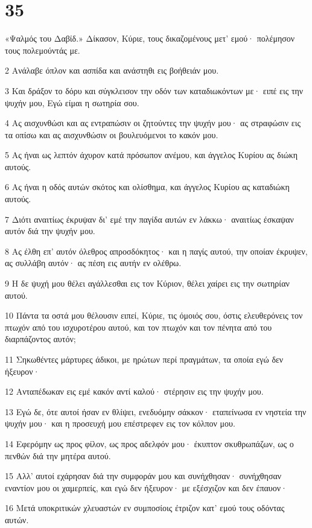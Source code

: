 \chapter{35}

\par «Ψαλμός του Δαβίδ.» Δίκασον, Κύριε, τους δικαζομένους μετ' εμού· πολέμησον τους πολεμούντάς με.
\par 2 Ανάλαβε όπλον και ασπίδα και ανάστηθι εις βοήθειάν μου.
\par 3 Και δράξον το δόρυ και σύγκλεισον την οδόν των καταδιωκόντων με· ειπέ εις την ψυχήν μου, Εγώ είμαι η σωτηρία σου.
\par 4 Ας αισχυνθώσι και ας εντραπώσιν οι ζητούντες την ψυχήν μου· ας στραφώσιν εις τα οπίσω και ας αισχυνθώσιν οι βουλευόμενοι το κακόν μου.
\par 5 Ας ήναι ως λεπτόν άχυρον κατά πρόσωπον ανέμου, και άγγελος Κυρίου ας διώκη αυτούς.
\par 6 Ας ήναι η οδός αυτών σκότος και ολίσθημα, και άγγελος Κυρίου ας καταδιώκη αυτούς.
\par 7 Διότι αναιτίως έκρυψαν δι' εμέ την παγίδα αυτών εν λάκκω· αναιτίως έσκαψαν αυτόν διά την ψυχήν μου.
\par 8 Ας έλθη επ' αυτόν όλεθρος απροσδόκητος· και η παγίς αυτού, την οποίαν έκρυψεν, ας συλλάβη αυτόν· ας πέση εις αυτήν εν ολέθρω.
\par 9 Η δε ψυχή μου θέλει αγάλλεσθαι εις τον Κύριον, θέλει χαίρει εις την σωτηρίαν αυτού.
\par 10 Πάντα τα οστά μου θέλουσιν ειπεί, Κύριε, τις όμοιός σου, όστις ελευθερόνεις τον πτωχόν από του ισχυροτέρου αυτού, και τον πτωχόν και τον πένητα από του διαρπάζοντος αυτόν;
\par 11 Σηκωθέντες μάρτυρες άδικοι, με ηρώτων περί πραγμάτων, τα οποία εγώ δεν ήξευρον·
\par 12 Ανταπέδωκαν εις εμέ κακόν αντί καλού· στέρησιν εις την ψυχήν μου.
\par 13 Εγώ δε, ότε αυτοί ήσαν εν θλίψει, ενεδυόμην σάκκον· εταπείνωσα εν νηστεία την ψυχήν μου· και η προσευχή μου επέστρεφεν εις τον κόλπον μου.
\par 14 Εφερόμην ως προς φίλον, ως προς αδελφόν μου· έκυπτον σκυθρωπάζων, ως ο πενθών διά την μητέρα αυτού.
\par 15 Αλλ' αυτοί εχάρησαν διά την συμφοράν μου και συνήχθησαν· συνήχθησαν εναντίον μου οι χαμερπείς, και εγώ δεν ήξευρον· με εξέσχιζον και δεν έπαυον·
\par 16 Μετά υποκριτικών χλευαστών εν συμποσίοις έτριζον κατ' εμού τους οδόντας αυτών.

